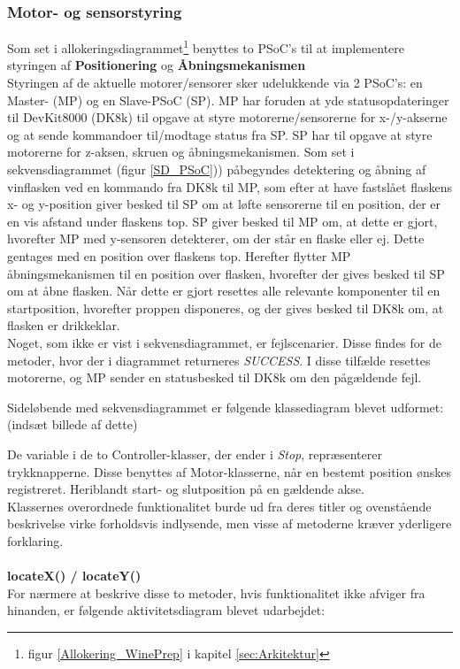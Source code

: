 \subsubsection{Motor- og sensorstyring}
Som set i allokeringsdiagrammet\footnote{figur \ref{Allokering_WinePrep} i kapitel \ref{sec:Arkitektur}} benyttes to PSoC's til at implementere styringen af \textbf{Positionering} og \textbf{Åbningsmekanismen} \\
Styringen af de aktuelle motorer/sensorer sker udelukkende via 2 PSoC's: en Master- (MP) og en Slave-PSoC (SP). MP har foruden at yde statusopdateringer til DevKit8000 (DK8k) til opgave at styre motorerne/sensorerne for x-/y-akserne og at sende kommandoer til/modtage status fra SP. SP har til opgave at styre motorerne for z-aksen, skruen og åbningsmekanismen. Som set i sekvensdiagrammet (figur \ref{SD_PSoC})) påbegyndes detektering og åbning af vinflasken ved en kommando fra DK8k til MP, som efter at have fastslået flaskens x- og y-position giver besked til SP om at løfte sensorerne til en position, der er en vis afstand under flaskens top. SP giver besked til MP om, at dette er gjort, hvorefter MP med y-sensoren detekterer, om der står en flaske eller ej. Dette gentages med en position over flaskens top. Herefter flytter MP åbningsmekanismen til en position over flasken, hvorefter der gives besked til SP om at åbne flasken. Når dette er gjort resettes alle relevante komponenter til en startposition, hvorefter proppen disponeres, og der gives besked til DK8k om, at flasken er drikkeklar. \\
Noget, som ikke er vist i sekvensdiagrammet, er fejlscenarier. Disse findes for de metoder, hvor der i diagrammet returneres \textit{SUCCESS}. I disse tilfælde resettes motorerne, og MP sender en statusbesked til DK8k om den pågældende fejl.

Sideløbende med sekvensdiagrammet er følgende klassediagram blevet udformet: (indsæt billede af dette)

De variable i de to Controller-klasser, der ender i \textit{Stop}, repræsenterer trykknapperne. Disse benyttes af Motor-klasserne, når en bestemt position ønskes registreret. Heriblandt start- og slutposition på en gældende akse. \\
Klassernes overordnede funktionalitet burde ud fra deres titler og ovenstående beskrivelse virke forholdsvis indlysende, men visse af metoderne kræver yderligere forklaring.
\\
\\
\textbf{locateX() / locateY()} \\
For nærmere at beskrive disse to metoder, hvis funktionalitet ikke afviger fra hinanden, er følgende aktivitetsdiagram blevet udarbejdet: \\

